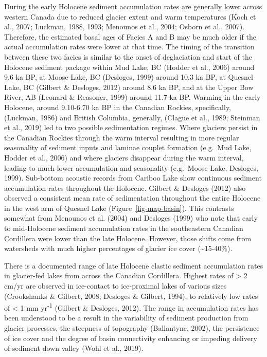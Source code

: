 \documentclass[
  letterpaper,
  DIV=11,
  numbers=noendperiod]{scrartcl}
\begin{document}
During the early Holocene sediment accumulation rates are generally
lower across western Canada due to reduced glacier extent and warm
temperatures (Koch et al., 2007; Luckman, 1988, 1993; Menounos et al.,
2004; Osborn et al., 2007). Therefore, the estimated basal ages of
Facies A and B may be much older if the actual accumulation rates were
lower at that time. The timing of the transition between these two
facies is similar to the onset of deglaciation and start of the Holocene
sediment package within Mud Lake, BC (Hodder et al., 2006) around 9.6 ka
BP, at Moose Lake, BC (Desloges, 1999) around 10.3 ka BP, at Quesnel
Lake, BC (Gilbert \& Desloges, 2012) around 8.6 ka BP, and at the Upper
Bow River, AB (Leonard \& Reasoner, 1999) around 11.7 ka BP. Warming in
the early Holocene, around 9.10-6.70 ka BP in the Canadian Rockies,
specifically, (Luckman, 1986) and British Columbia, generally, (Clague
et al., 1989; Steinman et al., 2019) led to two possible sedimentation
regimes. Where glaciers persist in the Canadian Rockies through the warm
interval resulting in more regular seasonality of sediment inputs and
laminae couplet formation (e.g.~Mud Lake, Hodder et al., 2006) and where
glaciers disappear during the warm interval, leading to much lower
accumulation and seasonality (e.g.~Moose Lake, Desloges, 1999).
Sub-bottom acoustic records from Cariboo Lake show continuous sediment
accumulation rates throughout the Holocene. Gilbert \& Desloges (2012)
also observed a consistent mean rate of sedimentation throughout the
entire Holocene in the west arm of Quesnel Lake
(Figure~\ref{fig-map-basin}). This contrasts somewhat from Menounos et
al. (2004) and Desloges (1999) who note that early to mid-Holocene
sediment accumulation rates in the southeastern Canadian Cordillera were
lower than the late Holocene. However, those shifts come from watersheds
with much higher percentages of glacier ice cover
(\textasciitilde15-40\%).

There is a documented range of late Holocene clastic sediment
accumulation rates in glacier-fed lakes from across the Canadian
Cordillera. Highest rates of \textgreater{} 2 cm/yr are observed in
ice-contact to ice-proximal lakes of various sizes (Crookshanks \&
Gilbert, 2008; Desloges \& Gilbert, 1994), to relatively low rates of
\textless{} 1 mm yr\textsuperscript{-1} (Gilbert \& Desloges, 2012). The
range in accumulation rates has been understood to be a result in the
variability of sediment production from glacier processes, the steepness
of topography (Ballantyne, 2002), the persistence of ice cover and the
degree of basin connectivity enhancing or impeding delivery of sediment
down valley (Wohl et al., 2019).
\end{document}
